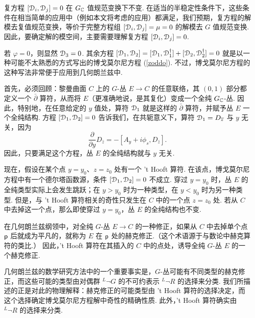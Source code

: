 复方程 $[{\mathcal D}_i,{\mathcal D}_j]=0$ 在 $G_{\mathbb C}$ 值规范变换下不变. 在适当的半稳定性条件下，这些条件在相当简单的应用中（例如本文将考虑的应用）都满足，我们预期，复方程的解模去复值规范变换，等价于完整方程组 $[{\mathcal D}_i,{\mathcal D}_j]=\mu=0$ 的解模去 $G$ 值规范变换. 因此，要确定解的模空间，主要需要理解复方程 $[{\mathcal D}_i,{\mathcal D}_j]=0$.

若 $\varphi=0$，则显然 ${\mathcal D}_3=0$. 其余方程 $[{\mathcal D}_1,{\mathcal D}_2]=[{\mathcal D}_1,{\mathcal D}_1^\dagger]+[{\mathcal D}_2,{\mathcal D}_2^\dagger]=0$ 就是以一种可能不太熟悉的方式写出的博戈莫尔尼方程 (\ref{zoddo}).
不过，博戈莫尔尼方程的这种写法非常便于应用到几何朗兰兹中.

首先，必须回顾：黎曼曲面 $C$ 上的 $G$-丛 $E\to C$ 的任意联络，其 $(0,1)$ 部分都定义一个 $\bar\partial$ 算符，从而将 $E$（更准确地说，是其复化）变成一个全纯 $G_{\mathbb C}$-丛. 因此，特别地，在任意给定的 $y$ 值处，算符 ${\mathcal D}_1$ 就是这样的 $\bar\partial $ 算符，并赋予丛 $E$ 一个全纯结构. 方程 $[{\mathcal D}_1,{\mathcal D}_2]=0$ 告诉我们，在共轭意义下，算符 ${\mathcal D}_1=D_{\overline z}$ 与 $y$ 无关，因为
\begin{equation}\label{zobo}\frac{\partial}{\partial y}D_{\bar z}=-[A_y+i\phi_s,D_{\bar z}].  \end{equation}
因此，只要满足这个方程，丛 $E$ 的全纯结构就与 $y$ 无关.

现在，假设在某个点 $y=y_0$、$z=z_0$ 处有一个 't Hooft 算符. 在该点，博戈莫尔尼方程中有一个德尔塔函数源，条件 $[{\mathcal D}_1,{\mathcal D}_2]=0$ 不成立. 穿过 $y=y_0$ 时，丛 $E$ 的全纯类型实际上会发生跳跃；在 $y>y_0$ 时为一种类型，在 $y<y_0$ 时为另一种类型. 但是，与 't Hooft 算符相关的奇性只发生在 $C$ 中的一个点 $z=z_0$ 处.
若从 $C$ 中去掉这一个点，那么即使穿过 $y=y_0$，丛 $E $ 的全纯结构也不变.

在几何朗兰兹纲领中，对全纯 $G$-丛 $E\to C$ 的一种修正，如果从 $C$ 中去掉单个点 ${\sf p}$ 后就成为平凡的，就称为 $E$ 在 ${\sf p}$ 处的赫克修正.（这个术语源于与数论中赫克算符的类比.）
因此，'t Hooft 算符在其插入的 $C$ 中的点处，诱导全纯 $G$-丛 $E$ 的一个赫克修正.

几何朗兰兹的数学研究方法中的一个重要事实是，$G$-丛可能有不同类型的赫克修正，而这些可能的类型由对偶群 $^L\neg G$ 的不可约表示 $^L\neg R$ 的选择来分类. 我们所描述的正是对此的物理解释：赫克修正的可能类型由 't Hooft 算符的选择决定，而这个选择确定博戈莫尔尼方程解中奇性的精确性质.
此外，'t Hooft 算符确实由 $^L\neg R$ 的选择来分类.

